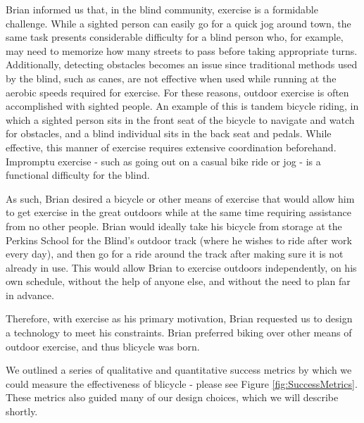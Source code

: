 \documentclass[aps,twocolumn,secnumarabic,balancelastpage,amsmath,amssymb,nofootinbib]{revtex4-1}
\begin{document}
Brian informed us that, in the blind community, exercise is a formidable challenge. While a sighted person can easily go for a quick jog around town, the same task presents considerable difficulty for a blind person who, for example, may need to memorize how many streets to pass before taking appropriate turns. Additionally, detecting obstacles becomes an issue since traditional methods used by the blind, such as canes, are not effective when used while running at the aerobic speeds required for exercise. For these reasons, outdoor exercise is often accomplished with sighted people. An example of this is tandem bicycle riding, in which a sighted person sits in the front seat of the bicycle to navigate and watch for obstacles, and a blind individual sits in the back seat and pedals. While effective, this manner of exercise requires extensive coordination beforehand. Impromptu exercise - such as going out on a casual bike ride or jog - is a functional difficulty for the blind.

As such, Brian desired a bicycle or other means of exercise that would allow him to get exercise in the great outdoors while at the same time requiring assistance from no other people. Brian would ideally take his bicycle from storage at the Perkins School for the Blind's outdoor track (where he wishes to ride after work every day), and then go for a ride around the track after making sure it is not already in use. This would allow Brian to exercise outdoors independently, on his own schedule, without the help of anyone else, and without the need to plan far in advance.

Therefore, with exercise as his primary motivation, Brian requested us to design a technology to meet his constraints. Brian preferred biking over other means of outdoor exercise, and thus blicycle was born.

We outlined a series of qualitative and quantitative success metrics by which we could measure the effectiveness of blicycle - please see Figure \ref{fig:SuccessMetrics}. These metrics also guided many of our design choices, which we will describe shortly.
\end{document}
